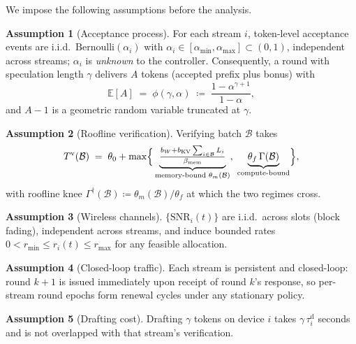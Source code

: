 \documentclass[11pt]{article}
\theoremstyle{definition}
\newtheorem{assumption}{Assumption}
\theoremstyle{remark}
\newcommand{\E}{\mathbb{E}}
\newcommand{\cB}{\mathcal{B}}
\begin{document}
We impose the following assumptions before the analysis.

\begin{assumption}[Acceptance process]\label{as:acceptance}
For each stream $i$, token-level acceptance events are i.i.d.\
$\mathrm{Bernoulli}(\alpha_i)$ with $\alpha_i\in[\alpha_{\min},
\alpha_{\max}]\subset(0,1)$, independent across streams; $\alpha_i$ is
\emph{unknown} to the controller. Consequently, a round with speculation
length $\gamma$ delivers $A$ tokens (accepted prefix plus bonus) with
\begin{equation}\label{eq:phi}
\E[A]\;=\;\phi(\gamma,\alpha)\;\coloneqq\;\frac{1-\alpha^{\gamma+1}}{1-\alpha},
\end{equation}
and $A-1$ is a geometric random variable truncated at $\gamma$.
\end{assumption}

\begin{assumption}[Roofline verification]\label{as:roofline}
Verifying batch $\cB$ takes
\begin{equation}\label{eq:Tv}
T^{\mathrm{v}}(\cB)\;=\;\theta_0+\max\Bigl\{\,
\underbrace{\tfrac{b_W+b_{\mathrm{KV}}\sum_{i\in\cB}L_i}{\beta_{\mathrm{mem}}}}_{\text{memory-bound }\theta_m(\cB)},\;
\underbrace{\theta_f\,\Gamma(\cB)}_{\text{compute-bound}}\Bigr\},
\end{equation}
with roofline knee $\Gamma^{\dagger}(\cB)\coloneqq\theta_m(\cB)/\theta_f$ at
which the two regimes cross.
\end{assumption}

\begin{assumption}[Wireless channels]\label{as:channel}
$\{\mathrm{SNR}_i(t)\}$ are i.i.d.\ across slots (block fading), independent
across streams, and induce bounded rates $0<r_{\min}\le r_i(t)\le r_{\max}$
for any feasible allocation.
\end{assumption}

\begin{assumption}[Closed-loop traffic]\label{as:traffic}
Each stream is persistent and closed-loop: round $k+1$ is issued immediately
upon receipt of round $k$'s response, so per-stream round epochs form renewal
cycles under any stationary policy.
\end{assumption}

\begin{assumption}[Drafting cost]\label{as:draft}
Drafting $\gamma$ tokens on device $i$ takes $\gamma\,\tau_i^{\mathrm{d}}$
seconds and is not overlapped with that stream's verification.
\end{assumption}
\end{document}
